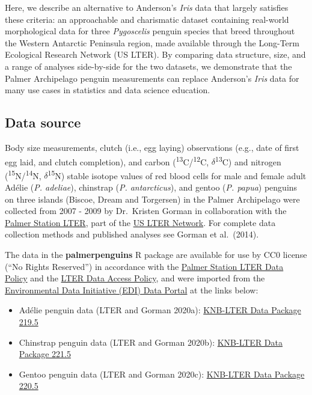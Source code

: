 Here, we describe an alternative to Anderson's \emph{Iris} data that
largely satisfies these criteria: an approachable and charismatic
dataset containing real-world morphological data for three
\emph{Pygoscelis} penguin species that breed throughout the Western
Antarctic Peninsula region, made available through the Long-Term
Ecological Research Network (US LTER). By comparing data structure,
size, and a range of analyses side-by-side for the two datasets, we
demonstrate that the Palmer Archipelago penguin measurements can replace
Anderson's \emph{Iris} data for many use cases in statistics and data
science education.

\hypertarget{data-source}{%
\subsection{Data source}\label{data-source}}

Body size measurements, clutch (i.e., egg laying) observations (e.g.,
date of first egg laid, and clutch completion), and carbon
(\textsuperscript{13}C/\textsuperscript{12}C,
\(\delta\)\textsuperscript{13}C) and nitrogen
(\textsuperscript{15}N/\textsuperscript{14}N,
\(\delta\)\textsuperscript{15}N) stable isotope values of red blood
cells for male and female adult Adélie (\emph{P. adeliae}), chinstrap
(\emph{P. antarcticus}), and gentoo (\emph{P. papua}) penguins on three
islands (Biscoe, Dream and Torgersen) in the Palmer Archipelago were
collected from 2007 - 2009 by Dr.~Kristen Gorman in collaboration with
the \href{https://pal.lternet.edu/}{Palmer Station LTER}, part of the
\href{https://lternet.edu/}{US LTER Network}. For complete data
collection methods and published analyses see Gorman et al.~(2014).

The data in the \textbf{palmerpenguins} R package are available for use
by CC0 license (``No Rights Reserved'') in accordance with the
\href{https://pal.lternet.edu/data/policies}{Palmer Station LTER Data
Policy} and the \href{https://lternet.edu/data-access-policy/}{LTER Data
Access Policy}, and were imported from the
\href{https://environmentaldatainitiative.org/}{Environmental Data
Initiative (EDI) Data Portal} at the links below:

\begin{itemize}
\tightlist
\item
  Adélie penguin data (LTER and Gorman 2020a):
  \href{https://portal.edirepository.org/nis/mapbrowse?packageid=knb-lter-pal.219.5}{KNB-LTER
  Data Package 219.5}
\item
  Chinstrap penguin data (LTER and Gorman 2020b):
  \href{https://portal.edirepository.org/nis/mapbrowse?packageid=knb-lter-pal.221.6}{KNB-LTER
  Data Package 221.5}
\item
  Gentoo penguin data (LTER and Gorman 2020c):
  \href{https://portal.edirepository.org/nis/mapbrowse?packageid=knb-lter-pal.220.5}{KNB-LTER
  Data Package 220.5}
\end{itemize}

